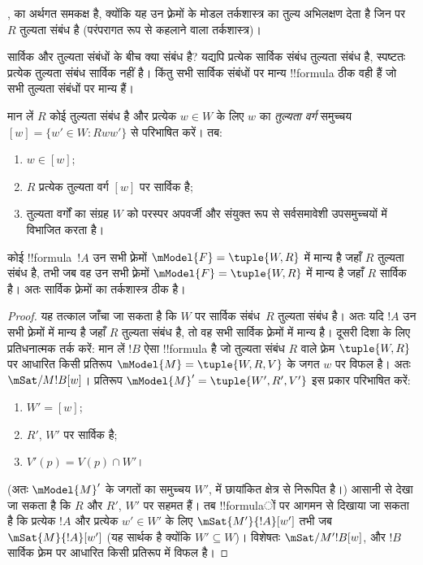 \documentclass[../../../include/open-logic-section]{subfiles}
\begin{document}
,  का अर्थगत समकक्ष है,
क्योंकि यह उन फ़्रेमों के मोडल तर्कशास्त्र का तुल्य अभिलक्षण देता है जिन पर
$R$ तुल्यता संबंध है (परंपरागत रूप से  कहलाने वाला तर्कशास्त्र)।

सार्विक और तुल्यता संबंधों के बीच क्या संबंध है? यद्यपि प्रत्येक सार्विक
संबंध तुल्यता संबंध है, स्पष्टतः प्रत्येक तुल्यता संबंध सार्विक नहीं है।
किंतु सभी सार्विक संबंधों पर मान्य !!{formula} ठीक वही हैं जो सभी तुल्यता
संबंधों पर मान्य हैं।

\begin{prop}
  मान लें $R$ कोई तुल्यता संबंध है और प्रत्येक $w \in W$ के लिए $w$ का
  \emph{तुल्यता वर्ग} समुच्चय $[w] = \{w'\in W : Rww'\}$ से परिभाषित करें।
  तब:
  \begin{enumerate}
  \item $w \in [w]$;
  \item $R$ प्रत्येक तुल्यता वर्ग $[w]$ पर सार्विक है;
  \item तुल्यता वर्गों का संग्रह $W$ को परस्पर अपवर्जी और संयुक्त रूप से
    सर्वसमावेशी उपसमुच्चयों में विभाजित करता है।
  \end{enumerate}
\end{prop}

\begin{prop}
  कोई !!{formula}~$!A$ उन सभी फ़्रेमों $\mModel{F} =\tuple{W,R}$ में मान्य है
  जहाँ $R$ तुल्यता संबंध है, तभी जब वह उन सभी फ़्रेमों
  $\mModel{F} =\tuple{W,R}$ में मान्य है जहाँ $R$ सार्विक है। अतः सार्विक
  फ़्रेमों का तर्कशास्त्र ठीक  है।
\end{prop}

\begin{proof}
  यह तत्काल जाँचा जा सकता है कि $W$ पर सार्विक संबंध~$R$ तुल्यता संबंध है।
  अतः यदि $!A$ उन सभी फ़्रेमों में मान्य है जहाँ $R$ तुल्यता संबंध है, तो वह
  सभी सार्विक फ़्रेमों में मान्य है। दूसरी दिशा के लिए प्रतिधनात्मक तर्क
  करें: मान लें $!B$ ऐसा !!{formula} है जो तुल्यता संबंध $R$ वाले फ़्रेम
  $\tuple{W,R}$ पर आधारित किसी प्रतिरूप
  $\mModel{M} = \tuple{W, R, V}$ के जगत $w$ पर विफल है। अतः
  $\mSat/{M}{!B}[w]$। प्रतिरूप $\mModel{M}' = \tuple{W',R',V'}$ इस प्रकार
  परिभाषित करें:
  \begin{enumerate}
  \item $W' = [w]$;
  \item $R'$, $W'$ पर सार्विक है;
  \item $V'(p) = V(p) \cap W'$।
  \end{enumerate}
  (अतः $\mModel{M}'$ के जगतों का समुच्चय $W'$,
   में छायांकित क्षेत्र से निरूपित है।) आसानी से देखा
  जा सकता है कि $R$ और $R'$, $W'$ पर सहमत हैं। तब !!{formula}ों पर आगमन से
  दिखाया जा सकता है कि प्रत्येक $!A$ और प्रत्येक $w' \in W'$ के लिए
  $\mSat{M'}{!A}[w']$ तभी जब $\mSat{M}{!A}[w']$ (यह सार्थक है क्योंकि
  $W' \subseteq W$)। विशेषतः $\mSat/{M'}{!B}[w]$, और $!B$ सार्विक फ़्रेम
  पर आधारित किसी प्रतिरूप में विफल है।
\end{proof}
\end{document}
